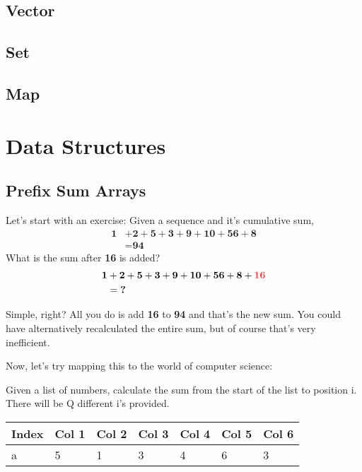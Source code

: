 \documentclass{report}
\begin{document}
\subsection{Vector}
\subsection{Set}
\subsection{Map}

\section{Data Structures}
\subsection{Prefix Sum Arrays}
Let’s start with an exercise: Given a sequence and it’s cumulative sum,
\begin{align*}
    \textbf{1} &+ \textbf{2} + \textbf{5} + \textbf{3} + \textbf{9} + \textbf{10} + \textbf{56} + \textbf{8} \\
    &= \textbf{94}
\end{align*}
What is the sum after \textbf{16} is added?
\begin{align*}
    \textbf{1} &+ \textbf{2} + \textbf{5} + \textbf{3} + \textbf{9} + \textbf{10} + \textbf{56} + \textbf{8} + \textcolor{red!80}{\textbf{16}} \\
    &= \textbf{?}
\end{align*}

Simple, right? All you do is add \textbf{16} to \textbf{94} and that’s the new sum. You could have alternatively recalculated the entire sum, but of course that’s very inefficient.\newline

Now, let’s try mapping this to the world of computer science: \newline

Given a list of numbers, calculate the sum from the start of the list to position i. There will be Q different i’s provided.

\begin{table}[ht]
    \centering
    \begin{tabularx}{\linewidth}{|X|X|X|X|X|X|X|}
        \hline
        \cellcolor{gray!25} \textbf{Index} & \cellcolor{gray!25} \textbf{Col 1} & \cellcolor{gray!25} \textbf{Col 2} & \cellcolor{gray!25} \textbf{Col 3} & \cellcolor{gray!25} \textbf{Col 4} & \cellcolor{gray!25} \textbf{Col 5} & \cellcolor{gray!25} \textbf{Col 6}\\
        \hline
        \cellcolor{gray!25}a & 5 & 1 & 3 & 4 & 6 & 3 \\
        \hline
    \end{tabularx}
\end{table}
\end{document}

